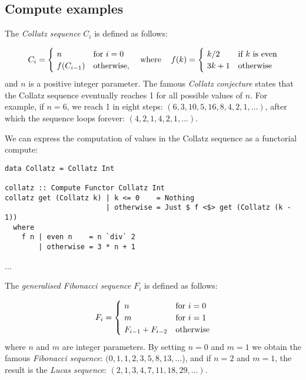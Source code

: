 \subsection{Compute examples}\label{sec-appendix-compute-examples}


The \emph{Collatz sequence} $C_i$ is defined as follows:

\[
C_{i} = {\begin{cases}~n&{\text{for }}i=0\\~f(C_{i-1})&{\text{otherwise}},\end{cases}}\hspace{12pt}\text{where}\hspace{12pt}f(k)={\begin{cases}~k/2&{\text{if }}k\text{ is even}\\~3k+1&{\text{otherwise}}\end{cases}}
\vspace{2mm}
\]
\noindent
and $n$ is a positive integer parameter. The famous \emph{Collatz conjecture}
states that the Collatz sequence eventually reaches 1 for all possible values of
$n$. For example, if $n=6$, we reach 1 in eight steps:
$(6, 3, 10, 5, 16, 8, 4, 2, 1, \dots)$, after which the sequence loops forever:
$(4, 2, 1, 4, 2, 1, \dots)$.

We can express the computation of values in the Collatz sequence as a functorial
compute:

\begin{verbatim}
data Collatz = Collatz Int

collatz :: Compute Functor Collatz Int
collatz get (Collatz k) | k <= 0    = Nothing
                        | otherwise = Just $ f <$> get (Collatz (k - 1))
  where
    f n | even n    = n `div` 2
        | otherwise = 3 * n + 1
\end{verbatim}

...

The \emph{generalised Fibonacci sequence} $F_i$ is defined as follows:

\[
F_{i} = {\begin{cases}~n&{\text{for }}i=0\\~m&{\text{for }}i=1\\~F_{i-1}+F_{i-2}&{\text{otherwise}}\end{cases}}
\vspace{2mm}
\]
\noindent
where $n$ and $m$ are integer parameters. By setting $n=0$ and $m=1$ we obtain
the famous \emph{Fibonacci sequence}: $(0, 1, 1, 2, 3, 5, 8, 13, \dots$), and if
$n=2$ and $m=1$, the result is the \emph{Lucas sequence}:
$(2, 1, 3, 4, 7, 11, 18, 29, \dots)$.

